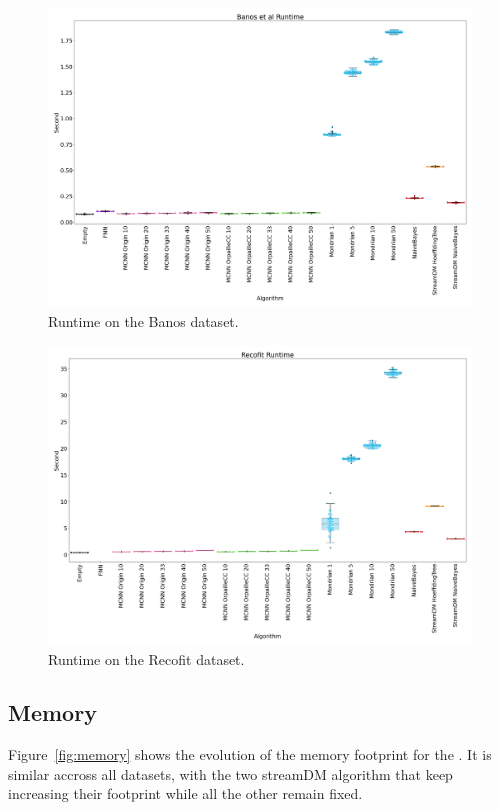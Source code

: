 \begin{figure}[H]
	\includegraphics[width=\linewidth]{figures/results/banos_runtime.png}
	\caption{Runtime on the Banos dataset.}
\end{figure}
\begin{figure}[H]
	\includegraphics[width=\linewidth]{figures/results/recofit_runtime.png}
	\caption{Runtime on the Recofit dataset.}
\end{figure}

\subsection{Memory}
Figure~\ref{fig:memory} shows the evolution of the memory footprint for the
\banosdataset.  It is similar accross all datasets, with the two streamDM
algorithm that keep increasing their footprint while all the other remain
fixed.

